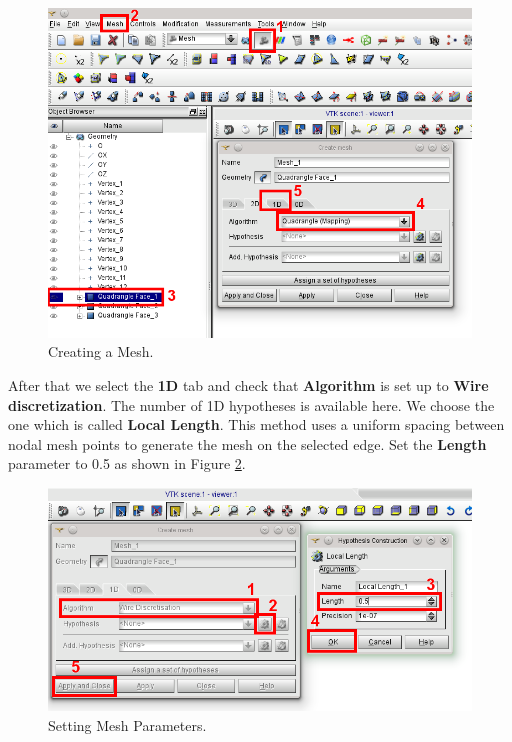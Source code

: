 \begin{figure}[h!]
\begin{center}
\includegraphics[scale=0.50]{figures/SalomeStep3.png}
\caption{Creating a Mesh.}
\label{fig:no3.2.1.9}
\end{center}
\end{figure}

After that we select the \textbf{1D} tab and check that \textbf{Algorithm} is set up to \textbf{Wire discretization}. The number of 1D hypotheses is available here. We choose the one which is called \textbf{Local Length}. This method uses a uniform spacing between nodal mesh points to generate the mesh on the selected edge. Set the \textbf{Length} parameter to 0.5 as shown in Figure \ref{fig:no3.2.1.10}.

\begin{figure}[h!]
\begin{center}
\includegraphics[scale=0.50]{figures/SalomeStep3b.png}
\caption{Setting Mesh Parameters.}
\label{fig:no3.2.1.10}
\end{center}
\end{figure}

